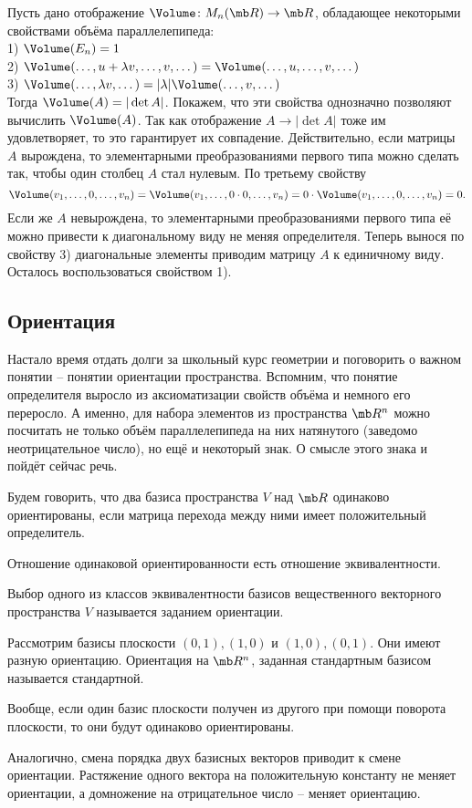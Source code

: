 \utv Пусть дано отображение $\Volume \colon M_n(\mb R) \to \mb R $, обладающее некоторыми свойствами объёма параллелепипеда: \\
1) $\Volume(E_n)=1$\\
2) $\Volume(\dots,u+\lambda v,\dots,v,\dots)=\Volume(\dots,u,\dots,v,\dots)$\\
3) $\Volume(\dots,\lambda v,\dots)=|\lambda|\Volume(\dots,v,\dots)$\\
Тогда $\Volume(A)=|\det A|$.
\proof Покажем, что эти свойства однозначно позволяют вычислить $\Volume(A)$. Так как отображение $A\to |\det A|$ тоже им удовлетворяет, то это гарантирует их совпадение.  Действительно, если матрицы $A$ вырождена, то элементарными преобразованиями первого типа можно сделать так, чтобы один столбец $A$ стал нулевым. По третьему свойству $$\Volume(v_1,\dots,0,\dots,v_n)=\Volume(v_1,\dots,0\cdot 0,\dots,v_n)=0\cdot \Volume(v_1,\dots,0,\dots,v_n)=0.$$
Если же $A$ невырождена, то элементарными преобразованиями первого типа её можно привести к диагональному виду не меняя определителя. Теперь вынося по свойству 3) диагональные элементы приводим матрицу $A$ к единичному виду. Осталось воспользоваться свойством 1).
\endproof
\eutv


\subsection{Ориентация}

Настало время отдать долги за школьный курс геометрии и поговорить о важном понятии -- понятии ориентации пространства.  Вспомним, что понятие определителя выросло из аксиоматизации свойств объёма и немного его переросло. А именно, для набора элементов из пространства $\mb R^n$ можно посчитать не только объём параллелепипеда на них натянутого (заведомо неотрицательное число), но ещё и некоторый знак. О смысле этого знака и пойдёт сейчас речь.



\dfn Будем говорить, что два базиса пространства $V$ над $\mb R$ одинаково ориентированы, если матрица перехода между ними имеет положительный определитель.
\edfn

\rm Отношение одинаковой ориентированности есть отношение эквивалентности.
\erm

\dfn Выбор одного из классов эквивалентности базисов вещественного векторного пространства $V$ называется заданием ориентации.
\edfn

\exm
\enm
\item Рассмотрим базисы  плоскости $(0,1),(1,0)$ и $(1,0),(0,1)$.  Они имеют разную ориентацию. Ориентация на $\mb R^n$, заданная стандартным базисом называется стандартной. 
\item Вообще, если один базис плоскости получен из другого при помощи поворота плоскости, то они будут одинаково ориентированы.
\item Аналогично, смена порядка двух базисных векторов приводит к смене ориентации. Растяжение одного вектора на положительную константу  не меняет ориентации, а домножение на отрицательное число -- меняет ориентацию.
\eenm


